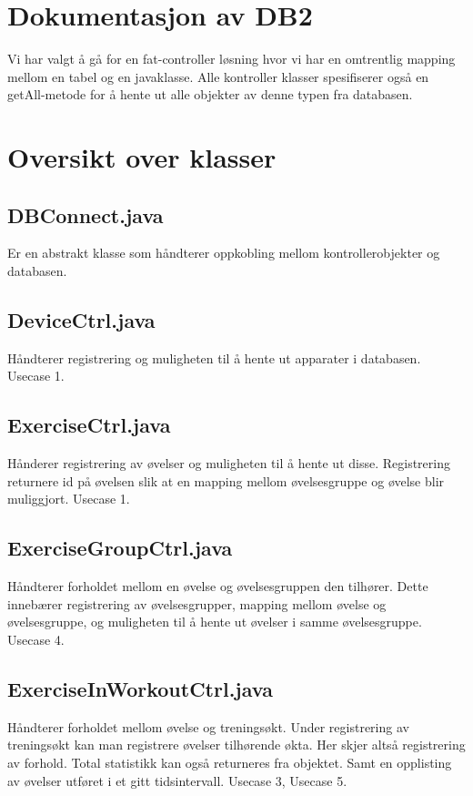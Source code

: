 \documentclass[11pt]{article}
\author{Eskild Trøen}
\date{\today}
\title{}
\begin{document}
\section{Dokumentasjon av DB2}
\label{sec:org8448e49}
Vi har valgt å gå for en fat-controller løsning hvor vi har en omtrentlig mapping mellom en tabel og en javaklasse. Alle kontroller klasser spesifiserer også en getAll-metode for å hente ut alle objekter av denne typen fra databasen.
\section{Oversikt over klasser}
\label{sec:orgc11c745}
\subsection{DBConnect.java}
\label{sec:orga6f6945}
Er en abstrakt klasse som håndterer oppkobling mellom kontrollerobjekter og databasen.
\subsection{DeviceCtrl.java}
\label{sec:orgb1e25b9}
Håndterer registrering og muligheten til å hente ut apparater i databasen. Usecase 1.
\subsection{ExerciseCtrl.java}
\label{sec:orge5d7aec}
Hånderer registrering av øvelser og muligheten til å hente ut disse. Registrering returnere id på øvelsen slik at en mapping mellom øvelsesgruppe og øvelse blir muliggjort. Usecase 1.
\subsection{ExerciseGroupCtrl.java}
\label{sec:orge469282}
Håndterer forholdet mellom en øvelse og øvelsesgruppen den tilhører. Dette innebærer registrering av øvelsesgrupper, mapping mellom øvelse og øvelsesgruppe, og muligheten til å hente ut øvelser i samme øvelsesgruppe. Usecase 4.
\subsection{ExerciseInWorkoutCtrl.java}
\label{sec:orgaa536ef}
Håndterer forholdet mellom øvelse og treningsøkt. Under registrering av treningsøkt kan man registrere øvelser tilhørende økta. Her skjer altså registrering av forhold. Total statistikk kan også returneres fra objektet. Samt en opplisting av øvelser utføret i et gitt tidsintervall. Usecase 3, Usecase 5.
\end{document}
